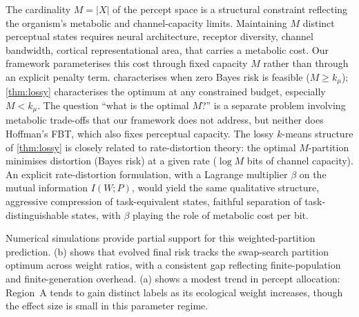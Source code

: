 \documentclass[12pt]{article}
\newcommand{\kmu}{k_\mu}
\begin{document}
The cardinality $M = |X|$ of the percept space is a structural constraint reflecting the organism's metabolic and channel-capacity limits. Maintaining $M$ distinct perceptual states requires neural architecture, receptor diversity, channel bandwidth, cortical representational area, that carries a metabolic cost. Our framework parameterises this cost through fixed capacity $M$ rather than through an explicit penalty term.  characterises when zero Bayes risk is feasible ($M \ge \kmu$); \cref{thm:lossy} characterises the optimum at any constrained budget, especially $M < \kmu$. The question ``what is the optimal $M$?'' is a separate problem involving metabolic trade-offs that our framework does not address, but neither does Hoffman's FBT, which also fixes perceptual capacity. The lossy $k$-means structure of \cref{thm:lossy} is closely related to rate-distortion theory: the optimal $M$-partition minimises distortion (Bayes risk) at a given rate ($\log M$ bits of channel capacity). An explicit rate-distortion formulation, with a Lagrange multiplier $\beta$ on the mutual information $I(W; P)$, would yield the same qualitative structure, aggressive compression of task-equivalent states, faithful separation of task-distinguishable states, with $\beta$ playing the role of metabolic cost per bit.

Numerical simulations provide partial support for this weighted-partition prediction. (b) shows that evolved final risk tracks the swap-search partition optimum across weight ratios, with a consistent gap reflecting finite-population and finite-generation overhead. (a) shows a modest trend in percept allocation: Region~A tends to gain distinct labels as its ecological weight increases, though the effect size is small in this parameter regime.
\end{document}
